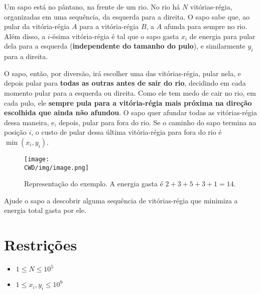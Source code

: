 %

Um sapo está no pântano, na frente de um rio. No rio há $N$ vitórias-régia, organizadas em uma sequência, da esquerda para a direita. O sapo sabe que, ao pular da vitória-régia $A$ para a vitória-régia $B$, a $A$ afunda para sempre no rio. Além disso, a $i$-ésima vitória-régia é tal que o sapo gasta $x_i$ de energia para pular dela para a esquerda (\textbf{independente do tamanho do pulo}), e similarmente $y_i$ para a direita.

O sapo, então, por diversão, irá escolher uma das vitórias-régia, pular nela, e depois pular para \textbf{todas as outras antes de sair do rio}, decidindo em cada momento pular para a esquerda ou direita. Como ele tem medo de cair no rio, em cada pulo, ele \textbf{sempre pula para a vitória-régia mais próxima na direção escolhida que ainda não afundou}. O sapo quer afundar todas as vitórias-régia dessa maneira, e, depois, pular para fora do rio. Se o caminho do sapo termina na posição $i$, o custo de pular dessa última vitória-régia para fora do rio é $\min(x_i, y_i)$.

\begin{figure}[H]
  \centering
  \texttt{[image: \\CWD/img/image.png]}
  \caption{Representação do exemplo. A energia gasta é $2+3+5+3+1=14$.}
\end{figure}

Ajude o sapo a descobrir alguma sequência de vitórias-régia que minimiza a energia total gasta por ele.

%
%

%
%


\section*{Restrições}

\begin{itemize}
\item $ 1 \leq N \leq 10^5$
\item $1 \leq x_i, y_i \leq 10^9$
\end{itemize}


\sampleio
